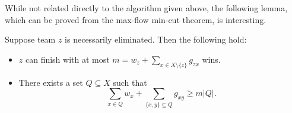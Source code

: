 While not related directly to the algorithm given above, the following lemma, which can be proved from the max-flow min-cut theorem, is interesting.

\begin{lemma}
	Suppose team $z$ is necessarily eliminated. Then the following hold:
	\begin{itemize}
		\item $z$ can finish with at most $m = w_z + \sum_{x\in X\setminus\{z\}} g_{zx}$ wins.
		\item There exists a set $Q\subseteq X$ such that
		\[ \sum_{x\in Q} w_x + \sum_{\{x,y\}\subseteq Q} g_{xy} \geq m|Q|. \]
	\end{itemize}
\end{lemma}